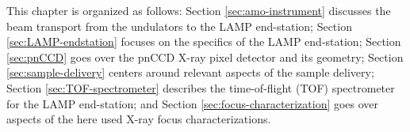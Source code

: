 %
This chapter is organized as follows: Section \ref{sec:amo-instrument} discusses the beam transport from the undulators to the LAMP end-station; Section \ref{sec:LAMP-endstation} focuses on the specifics of the LAMP end-station; Section \ref{sec:pnCCD} goes over the pnCCD X-ray pixel detector and its geometry; Section \ref{sec:sample-delivery} centers around relevant aspects of the sample delivery; Section \ref{sec:TOF-spectrometer} describes the time-of-flight (TOF) spectrometer for the LAMP end-station; and Section \ref{sec:focus-characterization} goes over aspects of the here used X-ray focus characterizations.
%
%
%
